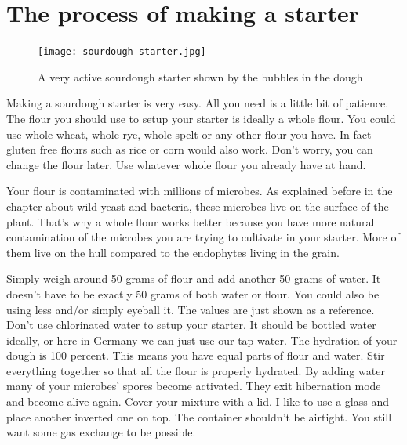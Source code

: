 \section{The process of making a starter}

\begin{figure}[!htb]
  \texttt{[image: sourdough-starter.jpg]}
  \caption{A very active sourdough starter shown by the bubbles in the dough}
  \label{fig:sourdough-starter}
\end{figure}

Making a sourdough starter is very easy. All you need
is a little bit of patience. The flour you should
use to setup your starter is ideally a whole flour.
You could use whole wheat, whole rye, whole spelt or
any other flour you have. In fact gluten free flours such
as rice or corn would also work. Don't worry, you can
change the flour later. Use whatever whole flour you
already have at hand.

Your flour is contaminated with millions of microbes. As explained
before in the chapter about wild yeast and bacteria, these
microbes live on the surface of the plant. That's why
a whole flour works better because you have more natural
contamination of the microbes you are trying to cultivate
in your starter. More of them live on the hull compared to the
endophytes living in the grain.

Simply weigh around 50 grams of flour and add another 50
grams of water. It doesn't have to be exactly 50 grams of both
water or flour. You could also be using less and/or simply eyeball
it. The values are just shown as a reference. Don't use chlorinated
water to setup your starter. It should be bottled water ideally,
or here in Germany we can just use our tap water. The hydration
of your dough is 100 percent. This means you have equal parts
of flour and water. Stir everything together so that all the flour
is properly hydrated. By adding water many of your microbes'
spores become activated. They exit hibernation mode and
become alive again. Cover your mixture with a lid. I like to
use a glass and place another inverted one on top. The container shouldn't
be airtight. You still want some gas exchange to be possible.

